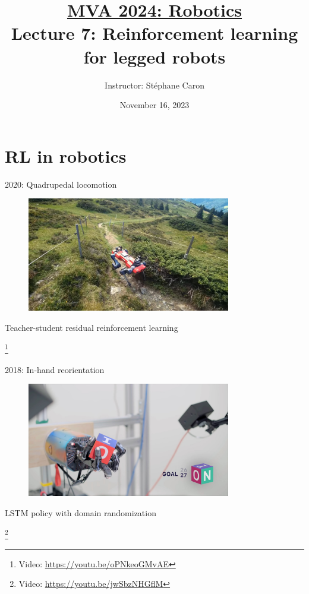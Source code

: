 \documentclass[10pt, aspectratio=1610]{beamer}
\title{\href{https://www.master-mva.com/cours/robotics/}{MVA 2024: Robotics} \\ Lecture 7: Reinforcement learning for legged robots}
\author{Instructor: {St\'ephane Caron}}
\date{November 16, 2023}
\institute{\href{https://www.inria.fr/en}{Inria}, \href{https://www.ens.psl.eu/en}{\'{E}cole normale sup\'{e}rieure}}
\newcommand\blfootnote[1]{%
  \begingroup
  \renewcommand\thefootnote{}%
  \footnote{#1}%
  \addtocounter{footnote}{-1}%
  \endgroup
}
\begin{document}
\maketitle


\section*{RL in robotics}

\begin{frame}{2020: Quadrupedal locomotion}
    \vspace{1.5em}
    \begin{figure}
        \includegraphics[height=5cm]{figures/hike-with-anymal.jpg}
    \end{figure}
    \begin{center}
        Teacher-student residual reinforcement learning~\cite{lee2020}
    \end{center}
    \blfootnote{Video: \url{https://youtu.be/oPNkeoGMvAE}}
\end{frame}

\begin{frame}{2018: In-hand reorientation}
    \vspace{1.5em}
    \begin{figure}
        \includegraphics[height=5cm]{figures/in-hand-reorientation.jpg}
    \end{figure}
    \begin{center}
        LSTM policy with domain randomization~\cite{andrychowicz2020learning}
    \end{center}
    \blfootnote{Video: \url{https://youtu.be/jwSbzNHGflM}}
\end{frame}
\end{document}

